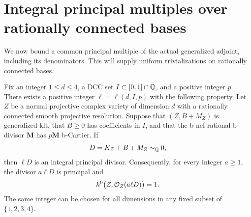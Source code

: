 \section{Integral principal multiples over rationally connected bases}
\label{sec:torsion}

We now bound a common principal multiple of the actual generalized
adjoint, including its denominators.  This will supply uniform
trivializations on rationally connected bases.

\begin{proposition}\label{prop:rc-torsion}
Fix an integer $1\leq d\leq 4$, a DCC set
$I\subset [0,1]\cap\mathbb Q$, and a positive integer $p$.
There exists a positive integer $\ell=\ell(d,I,p)$ with the following
property.  Let $Z$ be a normal projective complex variety of dimension $d$
with a rationally connected smooth projective resolution.  Suppose that
$(Z,B+M_Z)$ is generalized klt, that $B\geq 0$ has coefficients in $I$,
and that the b-nef rational b-divisor $\mathbf M$ has $p\mathbf M$
b-Cartier.  If
\[
 D=K_Z+B+M_Z\sim_{\mathbb Q}0,
\]
then $\ell D$ is an integral principal divisor.  Consequently, for every
integer $a\geq1$, the divisor $a\ell D$ is principal and
\[
 h^0\bigl(Z,\mathcal O_Z(a\ell D)\bigr)=1.
\]
The same integer can be chosen for all dimensions in any fixed subset of
$\{1,2,3,4\}$.
\end{proposition}


